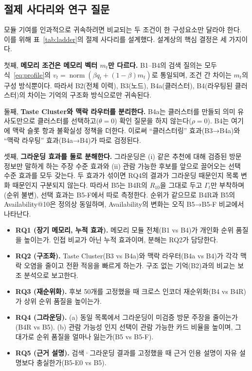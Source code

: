 \documentclass[10pt,twocolumn,letterpaper]{article}
\newcommand{\norm}{\operatorname{norm}}
\begin{document}
\subsection{절제 사다리와 연구 질문}
\label{sec:ladder}
모듈 기여를 인과적으로 귀속하려면 비교되는 두 조건이 한 구성요소만 달라야 한다. 이를 위해 표~\ref{tab:ladder}의 절제 사다리를 설계했다. 설계상의 핵심 결정은 세 가지이다.

첫째, \textbf{메모리 조건은 메모리 벡터 $m_t$만 다르다.} B1–B4의 검색 질의는 모두 식~\eqref{eq:profile}의 $v_t=\norm(\beta q_t+(1-\beta)m_t)$로 통일되며, 조건 간 차이는 $m_t$의 구성 방식뿐이다. 따라서 B2(전체 이력), B3(노드), B4a(클러스터), B4(라우팅된 클러스터)의 차이는 기억의 구조화 방식으로만 귀속된다.

둘째, \textbf{Taste Cluster와 맥락 라우터를 분리한다.} B4a는 클러스터를 만들되 의미 유사도만으로 클러스터를 선택하고($\theta=0$) 확인 질문을 하지 않는다($\rho=0$). B4는 여기에 맥락 슬롯 항과 불확실성 정책을 더한다. 이로써 ``클러스터링'' 효과(B3→B4a)와 ``맥락 라우팅'' 효과(B4a→B4)가 따로 검정된다.

셋째, \textbf{그라운딩 효과를 둘로 분해한다.} 그라운딩은 (i) 같은 추천에 대해 검증된 방문 정보만 말하게 하는 주장 수준 효과와 (ii) 관람 가능한 후보를 앞으로 끌어오는 선택 수준 효과를 모두 갖는다. 두 효과가 섞이면 RQ4의 결과가 그라운딩 때문인지 목록 변화 때문인지 구분되지 않는다. 따라서 B5는 B4R의 $R_{10}$을 그대로 두고 $\Gamma_t$만 부착하며(순위 불변), 선택 효과는 B5-F에서 따로 측정한다. 순위가 같으므로 B4R과 B5의 Availability@10은 정의상 동일하며, Availability의 변화는 오직 B5→B5-F 비교에서 나타난다.

\begin{itemize}
\item \textbf{RQ1 (장기 메모리, 누적 효과).} 메모리 모듈 전체(B1 vs B4)가 개인화 순위 품질을 높이는가. 인접 비교가 아닌 누적 효과이며, 분해는 RQ2가 담당한다.
\item \textbf{RQ2 (구조화).} Taste Cluster(B3 vs B4a)와 맥락 라우터(B4a vs B4)가 각각 맥락 오염을 줄이고 전환 적응을 빠르게 하는가. 구조 없는 기억(B2)과의 비교는 보조 분석으로 보고한다.
\item \textbf{RQ3 (재순위화).} 후보 50개를 고정했을 때 크로스 인코더 재순위화(B4 vs B4R)가 상위 순위 품질을 높이는가.
\item \textbf{RQ4 (그라운딩).} (a) 동일 목록에서 그라운딩이 미검증 방문 주장을 줄이는가(B4R vs B5). (b) 관람 가능성 인지 선택이 관람 가능한 카드 비율을 높이며, 그 대가로 순위 품질을 얼마나 잃는가(B5 vs B5-F).
\item \textbf{RQ5 (근거 설명).} 검색·그라운딩 결과를 고정했을 때 근거 인용 설명이 자유 설명보다 충실한가(B5-E0 vs B5).
\end{itemize}
\end{document}
